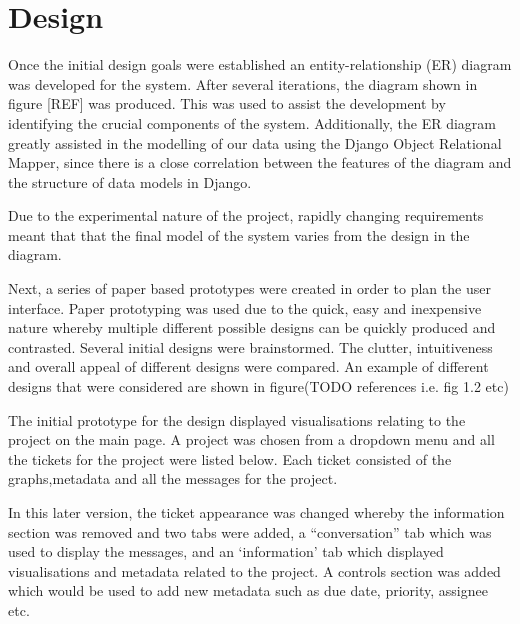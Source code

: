 \documentclass[a4paper]{l3proj}
\begin{document}
  \section{Design}
  \label{design}

  Once the initial design goals were established an entity-relationship (ER) diagram was developed for the system. After several iterations, the diagram shown in figure [REF] was produced. This was used to assist the development by identifying the crucial components of the system. Additionally, the ER diagram greatly assisted in the modelling of our data using the Django Object Relational Mapper, since there is a close correlation between the features of the diagram and the structure of data models in Django. 

  Due to the experimental nature of the project, rapidly changing requirements meant that that the final model of the system varies from the design in the diagram.

  Next, a series of paper based prototypes were created in order to plan the user interface. Paper prototyping was used due to the quick, easy and inexpensive nature whereby multiple different possible designs can be quickly produced and contrasted. Several initial designs were brainstormed. The clutter, intuitiveness and overall appeal of different designs were compared.  An example of different designs that were considered are shown in figure(TODO references i.e. fig 1.2 etc)

  The initial prototype for the design displayed visualisations relating to the project on the main page.  A project was chosen from a dropdown menu and all the tickets for the project were listed below.  Each ticket consisted of the graphs,metadata and all the messages for the project.

  In this later version, the ticket appearance was changed whereby the information section was removed and two tabs were added, a ``conversation'' tab which was used to display the messages, and an ‘information’ tab which displayed visualisations and metadata related to the project.  A controls section was added which would be used to add new metadata such as due date, priority, assignee etc.
\end{document}
